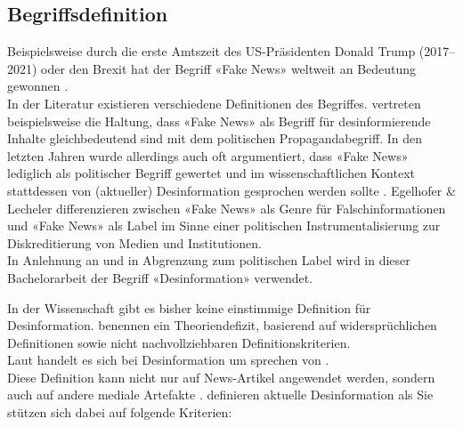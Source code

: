 \documentclass[12pt,a4paper]{article}        %
\begin{document}
\subsection{Begriffsdefinition}

Beispielsweise durch die erste Amtszeit des US-Präsidenten Donald Trump (2017–2021) oder den Brexit hat der Begriff «Fake News» weltweit an Bedeutung gewonnen \parencites[1f]{hohlfeld_schlechte_2020}[1]{marx_fake_2020}. \\
In der Literatur existieren verschiedene Definitionen des Begriffes. \textcite[246f]{hohlfeld_schlechte_2020} vertreten beispielsweise die Haltung, dass «Fake News» als Begriff für desinformierende Inhalte gleichbedeutend sind mit dem politischen Propagandabegriff. In den letzten Jahren wurde allerdings auch oft argumentiert, dass «Fake News» lediglich als politischer Begriff gewertet und im wissenschaftlichen Kontext stattdessen von (aktueller) Desinformation gesprochen werden sollte \parencites[3]{bontridder_role_2021}{habgood-coote_stop_2019}[148]{marx_fake_2020}. Egelhofer \& Lecheler \parencite[zit.\ nach][148]{marx_fake_2020} differenzieren zwischen «Fake News» als Genre für Falschinformationen und «Fake News» als Label im Sinne einer politischen Instrumentalisierung zur Diskreditierung von Medien und Institutionen.\\
In Anlehnung an \textcite{marx_fake_2020} und in Abgrenzung zum politischen Label wird in dieser Bachelorarbeit der Begriff «Desinformation» verwendet.

In der Wissenschaft gibt es bisher keine einstimmige Definition für Desinformation.
\textcite[148f]{marx_fake_2020} benennen ein Theoriendefizit, basierend auf widersprüchlichen Definitionen sowie nicht nachvollziehbaren Definitionskriterien.\\
Laut \textcite[1094]{lazer_science_2018} handelt es sich bei Desinformation um 
\textcite[213]{allcott_social_2017} sprechen von  \parencites[vgl.\ auch][140]{tandoc_jr_defining_2018}[1094]{lazer_science_2018}.\\
Diese Definition kann nicht nur auf News-Artikel angewendet werden, sondern auch auf andere mediale Artefakte \parencite[3]{bontridder_role_2021} \parencite[vgl.\ auch][16]{reuter_fake_2019}. \textcite[1]{marx_fake_2020} definieren aktuelle Desinformation als  Sie stützen sich dabei auf folgende Kriterien:
\end{document}
